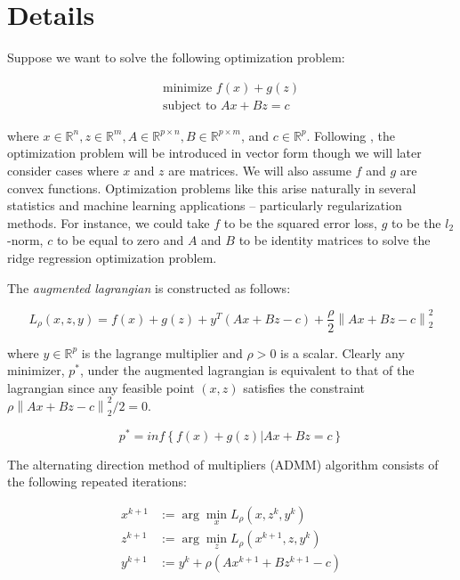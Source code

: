 \documentclass[12pt,]{book}
\theoremstyle{definition}
\theoremstyle{definition}
\theoremstyle{definition}
\theoremstyle{remark}
\begin{document}
\hypertarget{details}{%
\chapter{Details}\label{details}}

Suppose we want to solve the following optimization problem:

\begin{align*}
  \mbox{minimize } f(x) + g(z) \\
  \mbox{subject to } Ax + Bz = c
\end{align*}

where
\(x \in \mathbb{R}^{n}, z \in \mathbb{R}^{m}, A \in \mathbb{R}^{p \times n}, B \in \mathbb{R}^{p \times m}\),
and \(c \in \mathbb{R}^{p}\). Following \citet{boyd2011distributed}, the
optimization problem will be introduced in vector form though we will
later consider cases where \(x\) and \(z\) are matrices. We will also
assume \(f\) and \(g\) are convex functions. Optimization problems like
this arise naturally in several statistics and machine learning
applications -- particularly regularization methods. For instance, we
could take \(f\) to be the squared error loss, \(g\) to be the
\(l_{2}\)-norm, \(c\) to be equal to zero and \(A\) and \(B\) to be
identity matrices to solve the ridge regression optimization problem.

The \emph{augmented lagrangian} is constructed as follows:

\[ L_{\rho}(x, z, y) = f(x) + g(z) + y^{T}(Ax + Bz - c) + \frac{\rho}{2}\left\| Ax + Bz - c \right\|_{2}^{2} \]

where \(y \in \mathbb{R}^{p}\) is the lagrange multiplier and
\(\rho > 0\) is a scalar. Clearly any minimizer, \(p^{*}\), under the
augmented lagrangian is equivalent to that of the lagrangian since any
feasible point \((x, z)\) satisfies the constraint
\(\rho\left\| Ax + Bz - c \right\|_{2}^{2}/2 = 0\).

\[ p^{*} = inf\left\{ f(x) + g(z) | Ax + Bz = c \right\} \]

The alternating direction method of multipliers (ADMM) algorithm
consists of the following repeated iterations:

\begin{align}
  x^{k + 1} &:= \arg\min_{x}L_{\rho}(x, z^{k}, y^{k}) \\
  z^{k + 1} &:= \arg\min_{z}L_{\rho}(x^{k + 1}, z, y^{k}) \\
  y^{k + 1} &:= y^{k} + \rho(Ax^{k + 1} + Bz^{k + 1} - c)
\end{align}
\end{document}
